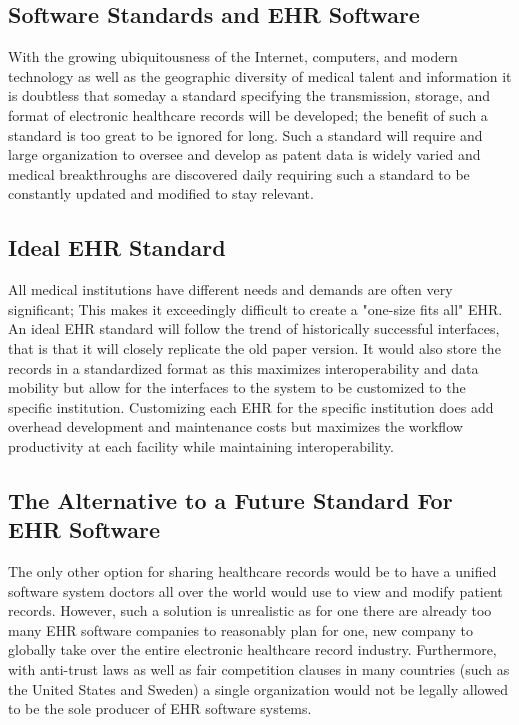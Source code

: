 \documentclass[14pt]{article}
\begin{document}
\subsection{Software Standards and EHR Software}
With the growing ubiquitousness of the Internet, computers, and modern technology as well as the geographic diversity of medical talent and information it is doubtless that someday a standard specifying the transmission, storage, and format of electronic healthcare records will be developed; the benefit of such a standard is too great to be ignored for long. Such a standard will require and large organization to oversee and develop as patent data is widely varied and medical breakthroughs are discovered daily requiring such a standard to be constantly updated and modified to stay relevant. 

\subsection{Ideal EHR Standard}
All medical institutions have different needs and demands  are often very significant; This makes it exceedingly difficult to create a "one-size fits all" \gls{EHR}. An ideal \gls{EHR} standard will follow the trend of historically successful interfaces, that is that it will closely replicate the old paper version. It would also store the records in a standardized format as this maximizes interoperability and data mobility but allow for the interfaces to the system to be customized to the specific institution. Customizing each \gls{EHR} for the specific institution does add overhead development and maintenance costs but maximizes the workflow productivity at each facility while maintaining interoperability. 

\subsection{The Alternative to a Future Standard For EHR Software}
The only other option for sharing healthcare records would be to have a unified software system doctors all over the world would use to view and modify patient records. However, such a solution is unrealistic as for one there are already too many \gls{EHR} software companies to reasonably plan for one, new company to globally take over the entire electronic healthcare record industry. Furthermore, with anti-trust laws as well as fair competition clauses in many countries (such as the United States and Sweden) a single organization would not be legally allowed to be the sole producer of \gls{EHR} software systems.
\end{document}
